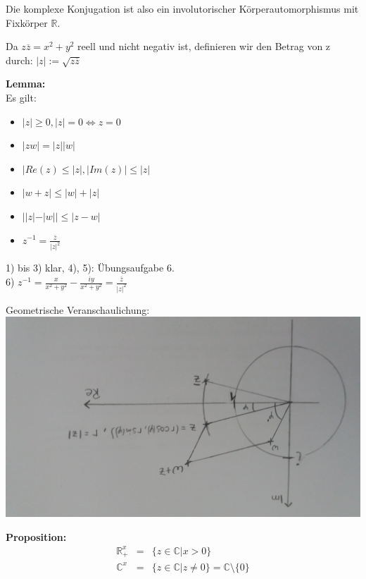 Die komplexe Konjugation ist also ein involutorischer Körperautomorphismus mit Fixkörper $\mathds{R}$.\\
\begin{definition}
	Da $z\overline{z} = x^2+y^2$ reell und nicht negativ ist, definieren wir den Betrag von z durch: $|z|:= \sqrt{z\overline{z}}$
\end{definition}

\textbf{Lemma: }\\
Es gilt:
\begin{itemize}
	\item
	$|z| \geq 0, |z| = 0 \Leftrightarrow z = 0$
	\item
	$|zw| = |z||w|$
	\item
	$|Re(z) \leq |z|, |Im(z)| \leq |z|$
	\item
	 $|w+z| \leq |w|+|z|$
	 \item
	 $||z|-|w|| \leq |z-w|$
	 \item
	 $z^{-1} = \frac{\overline{z}}{|z|^2}$
\end{itemize}
\begin{bew}
	1) bis 3) klar, 4), 5): Übungsaufgabe 6.\\
	6) $z^{-1} =  \frac{x}{x^2 +y^2}- \frac{iy}{x^2+y^2} = \frac{\overline{z}}{|z|^2}$
\end{bew}


\begin{bemerkung}
	Geometrische Veranschaulichung: \\
	\includegraphics[scale=0.1, angle=180]{pics/Polar.jpg} \\
\end{bemerkung}


\textbf{Proposition: }\\
\begin{eqnarray*}
\mathds{R}^x_+ &=& \{z \in \mathds{C}| x > 0\} \\
\mathds{C}^x &=& \{ z \in \mathds{C} | z \neq 0\} =  \mathds{C} \setminus\{0\} 
\end{eqnarray*}

